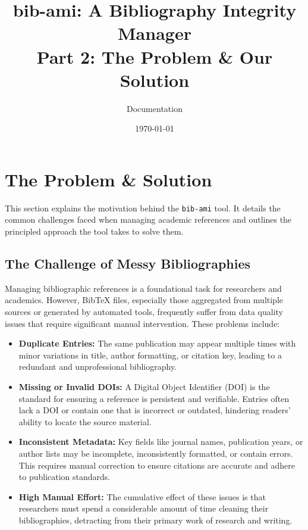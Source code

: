 \documentclass[11pt, a4paper]{article}
\title{\textbf{bib-ami}: A Bibliography Integrity Manager \\ \large Part 2: The Problem \& Our Solution}
\author{Documentation}
\date{\today}
\begin{document}
\maketitle
\tableofcontents
\newpage

\section{The Problem \& Solution}

This section explains the motivation behind the \texttt{bib-ami} tool. It details the common challenges faced when managing academic references and outlines the principled approach the tool takes to solve them.

\subsection{The Challenge of Messy Bibliographies}

Managing bibliographic references is a foundational task for researchers and academics. However, BibTeX files, especially those aggregated from multiple sources or generated by automated tools, frequently suffer from data quality issues that require significant manual intervention. These problems include:

\begin{itemize}[leftmargin=*]
    \item \textbf{Duplicate Entries:} The same publication may appear multiple times with minor variations in title, author formatting, or citation key, leading to a redundant and unprofessional bibliography.
    \item \textbf{Missing or Invalid DOIs:} A Digital Object Identifier (DOI) is the standard for ensuring a reference is persistent and verifiable. Entries often lack a DOI or contain one that is incorrect or outdated, hindering readers' ability to locate the source material.
    \item \textbf{Inconsistent Metadata:} Key fields like journal names, publication years, or author lists may be incomplete, inconsistently formatted, or contain errors. This requires manual correction to ensure citations are accurate and adhere to publication standards.
    \item \textbf{High Manual Effort:} The cumulative effect of these issues is that researchers must spend a considerable amount of time cleaning their bibliographies, detracting from their primary work of research and writing.
\end{itemize}
\end{document}
